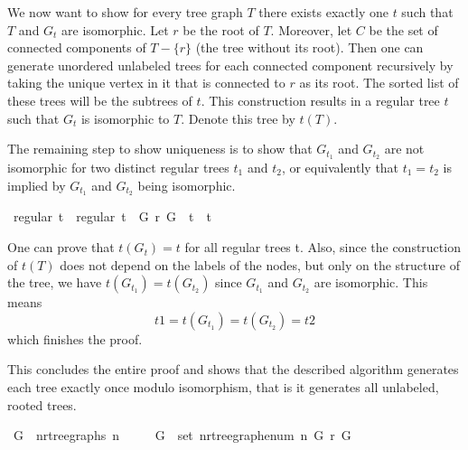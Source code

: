 We now want to show for every tree graph $T$ there exists exactly one $t$ such that $T$ and $G_t$ are isomorphic.
Let $r$ be the root of $T$.
Moreover, let $C$ be the set of connected components of $T - \{r\}$ (the tree without its root). 
Then one can generate unordered unlabeled trees for each connected component recursively by taking the unique vertex in it that is connected to $r$ as its root.
The sorted list of these trees will be the subtrees of $t$.
This construction results in a regular tree $t$ such that $G_t$ is isomorphic to $T$.
Denote this tree by $t(T)$.

The remaining step to show uniqueness is to show that $G_{t_1}$ and $G_{t_2}$ are not isomorphic for two distinct regular trees $t_1$ and $t_2$, or equivalently that $t_1 = t_2$ is implied by $G_{t_1}$ and $G_{t_2}$ being isomorphic.
\begin{isabellebox}
    \isamarkupfalse%
    {\kern0pt}\ {\isachardoublequoteopen}regular\ t{}\ {\isasymLongrightarrow}\ regular\ t{}\ {\isasymLongrightarrow}\ G\ {\isasymsimeq}\isactrlsub r\ G\ {\isasymLongrightarrow}\ t{}\ {\isacharequal}{\kern0pt}\ t{}{\isachardoublequoteclose}
\end{isabellebox}
One can prove that $t(G_t) = t$ for all regular trees t.
Also, since the construction of $t(T)$ does not depend on the labels of the nodes, but only on the structure of the tree, we have $t(G_{t_1}) = t(G_{t_2})$ since $G_{t_1}$ and $G_{t_2}$ are isomorphic.
This means
\[
    t1 = t(G_{t_1}) = t(G_{t_2}) = t2
\]
which finishes the proof.

This concludes the entire proof and shows that the described algorithm generates each tree exactly once modulo isomorphism, that is it generates all unlabeled, rooted trees.

\begin{isabellebox}
    \isamarkupfalse%
    \ {\isachardoublequoteopen}G\ {\isasymin}\ n{\isacharunderscore}{\kern0pt}rtree{\isacharunderscore}{\kern0pt}graphs\ n\isanewline
    \ \ \ \ {\isasymLongrightarrow}\ {\isasymexists}{\isacharbang}{\kern0pt}G{\isacharprime}{\kern0pt}\ {\isasymin}\ set\ {\isacharparenleft}{\kern0pt}n{\isacharunderscore}{\kern0pt}rtree{\isacharunderscore}{\kern0pt}graph{\isacharunderscore}{\kern0pt}enum\ n{\isacharparenright}{\kern0pt}{\isachardot}{\kern0pt}\ G{\isacharprime}{\kern0pt}\ {\isasymsimeq}\isactrlsub r\ G{\isachardoublequoteclose}
\end{isabellebox}
